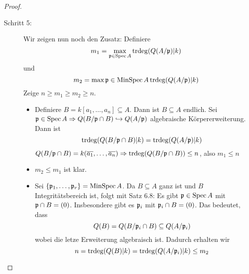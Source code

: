 \documentclass[12pt,a4paper]{scrartcl}
\theoremstyle{cplain}
\theoremstyle{cdef}
\begin{document}
\begin{proof}
\begin{description}
		\item[Schritt 5:] Wir zeigen nun noch den Zusatz: Definiere
		$$m_1 = \max_{\mathfrak{p}\in \operatorname{Spec} A}\operatorname{trdeg}(Q(A/\mathfrak{p})|k)$$
		und
		$$m_2 = \max{\mathfrak{p}\in\operatorname{MinSpec} A} \operatorname{trdeg}(Q(A/\mathfrak{p})|k)$$
		Zeige $n\ge m_1\ge m_2\ge n$.
		\begin{itemize}
			\item Definiere $B = k[a_1,\dots, a_n] \subseteq A$. Dann ist $B\subseteq A$ endlich. Sei $\mathfrak{p}\in\operatorname{Spec} A \Rightarrow Q(B/\mathfrak{p}\cap B)\hookrightarrow Q(A/\mathfrak{p})$ algebraische Körpererweiterung. Dann ist
			$$\operatorname{trdeg}(Q(B/\mathfrak{p}\cap B)|k) = \operatorname{trdeg}(Q(A/\mathfrak{p})|k)$$
			$Q(B/\mathfrak{p}\cap B) = k(\overline{a_1},\dots, \overline{a_n})\Rightarrow \operatorname{trdeg}(Q(B/\mathfrak{p}\cap B))\le n$, also $m_1\le n$
			\item $m_2\le m_1$ ist klar.
			\item Sei $\{\mathfrak{p}_1,\dots , \mathfrak{p}_r\} = \operatorname{MinSpec}A$. Da $B\subseteq A$ ganz ist und $B$ Integritätsbereich ist, folgt mit Satz 6.8: Es gibt $\mathfrak{p}\in \operatorname{Spec} A$ mit $\mathfrak{p}\cap B = (0)$. Insbesondere gibt es $\mathfrak{p}_i$ mit $\mathfrak{p}_i\cap B = (0)$. Das bedeutet, dass
			$$Q(B) = Q(B/\mathfrak{p}_i\cap B)\subseteq Q(A/\mathfrak{p}_i)$$
			wobei die letze Erweiterung algebraisch ist. Dadurch erhalten wir
			$$ n = \operatorname{trdeg}(Q(B)|k) = \operatorname{trdeg}(Q(A/\mathfrak{p}_i)|k) \le m_2$$
		\end{itemize}
	\end{description}
\end{proof}

\end{document}
